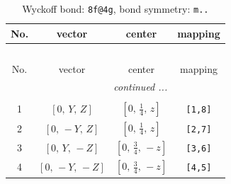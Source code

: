 \documentclass[fleqn,8pt]{jsarticle}
\begin{document}
\renewcommand{\arraystretch}{1.2}
\begin{longtable}{cccc}
\caption{Wyckoff bond: {\tt 8f@4g}, bond symmetry: {\tt m..}}
 \\
 \hline \hline
No. & vector & center & mapping \\ \hline \endfirsthead

\multicolumn{3}{l}{\tablename\ \thetable{}} \\
 \hline \hline
No. & vector & center & mapping \\ \hline \endhead

 \hline \hline
\multicolumn{3}{r}{\footnotesize\it continued ...} \\ \endfoot

 \hline \hline
\multicolumn{3}{r}{} \\ \endlastfoot

1 & $\left[ 0,\, Y,\, Z \right]$ & $\left[ 0,\, \frac{1}{4},\, z \right]$ & {\tt [1,8]} \\ \hline
2 & $\left[ 0,\, - Y,\, Z \right]$ & $\left[ 0,\, \frac{1}{4},\, z \right]$ & {\tt [2,7]} \\ \hline
3 & $\left[ 0,\, Y,\, - Z \right]$ & $\left[ 0,\, \frac{3}{4},\, - z \right]$ & {\tt [3,6]} \\ \hline
4 & $\left[ 0,\, - Y,\, - Z \right]$ & $\left[ 0,\, \frac{3}{4},\, - z \right]$ & {\tt [4,5]} \\
\end{longtable}
\renewcommand{\arraystretch}{1.2}
\end{document}
